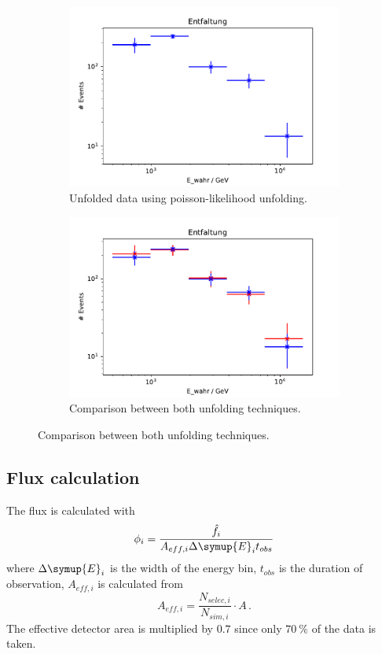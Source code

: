 \begin{figure}
\centering
\begin{subfigure}{0.45\textwidth}
  \includegraphics[width=\textwidth]{plots/Entfaltung_2.pdf}
  \caption{Unfolded data using poisson-likelihood unfolding.\label{fig:pois}}
\end{subfigure}
\begin{subfigure}{0.45\textwidth}
  \includegraphics[width=\textwidth]{plots/Entfaltung_vgl.pdf}
  \caption{Comparison between both unfolding techniques.\label{fig:vgl}}
\end{subfigure}
\end{figure}

\subsection{Flux calculation}
The flux is calculated with
\begin{equation}
  \phi_i = \frac{\hat{f}_i}{A_{eff,i} \Delta\symup{E}_i t_{obs}}
  \label{eqn:flux}
\end{equation}
where $\Delta\symup{E}_i$ is the width of the energy bin, $t_{obs}$ is the duration of observation, $A_{eff,i}$ is calculated from
\begin{equation}
  A_{eff,i} = \frac{N_{selec, i}}{N_{sim, i}} \cdot A\,.
\end{equation}
The effective detector area is multiplied by $0.7$ since only $\SI{70}{\percent}$ of the data is taken.


